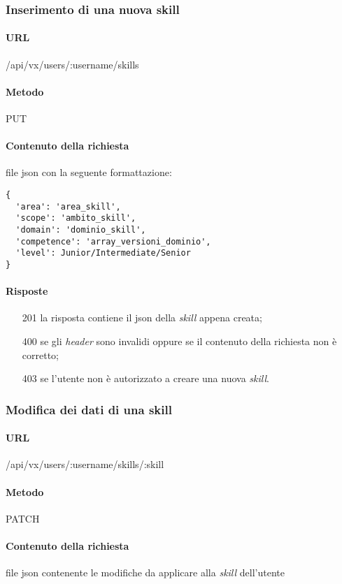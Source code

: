 \subsubsection{Inserimento di una nuova skill}
\paragraph{URL}
/api/vx/users/:username/skills
\paragraph{Metodo}
PUT
\paragraph{Contenuto della richiesta}
file \gls{json} con la seguente formattazione:
\begin{verbatim}
{
  'area': 'area_skill',
  'scope': 'ambito_skill',
  'domain': 'dominio_skill',
  'competence': 'array_versioni_dominio',
  'level': Junior/Intermediate/Senior
}
\end{verbatim}
\paragraph{Risposte}
\begin{itemize}
	\item[201] la risposta contiene il \gls{json} della \emph{skill} appena creata;
	\item[400] se gli \emph{header} sono invalidi oppure se il contenuto della richiesta non è corretto;
	\item[403] se l'utente non è autorizzato a creare una nuova \emph{skill}.
\end{itemize}

\subsubsection{Modifica dei dati di una skill}
\paragraph{URL}
/api/vx/users/:username/skills/:skill
\paragraph{Metodo}
PATCH
\paragraph{Contenuto della richiesta}
file \gls{json} contenente le modifiche da applicare alla \emph{skill} dell'utente
